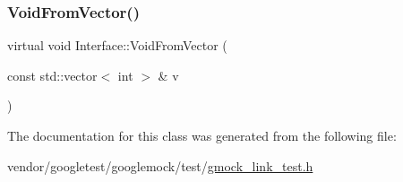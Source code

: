 \mbox{\label{class_interface_ae84fe7e53f881db2f823ad35d004927a}} 
\subsubsection{\texorpdfstring{Void\+From\+Vector()}{VoidFromVector()}}
{\footnotesize\ttfamily virtual void Interface\+::\+Void\+From\+Vector (\begin{DoxyParamCaption}\item[{const std\+::vector$<$ int $>$ \&}]{v }\end{DoxyParamCaption})\hspace{0.3cm}{\ttfamily [pure virtual]}}



The documentation for this class was generated from the following file\+:\begin{DoxyCompactItemize}
\item 
vendor/googletest/googlemock/test/\hyperlink{gmock__link__test_8h}{gmock\+\_\+link\+\_\+test.\+h}\end{DoxyCompactItemize}
